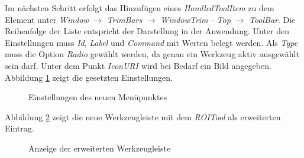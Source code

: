 Im nächsten Schritt erfolgt das Hinzufügen eines \textit{HandledToolItem} zu dem Element unter \textit{Window} $\rightarrow$ \textit{TrimBars} $\rightarrow$ \textit{WindowTrim - Top} $\rightarrow$ \textit{ToolBar}. Die Reihenfolge der Liste entspricht der Darstellung in der Anwendung. Unter den Einstellungen muss \textit{Id}, \textit{Label} und \textit{Command} mit Werten belegt werden. Als \textit{Type} muss die Option \textit{Radio} gewählt werden, da genau ein Werkzeug aktiv ausgewählt sein darf. Unter dem Punkt \textit{IconURI} wird bei Bedarf ein Bild angegeben. Abbildung \ref{tool_handleditem} zeigt die gesetzten Einstellungen.

\begin{figure}[H]
  \vspace{0.5cm}
  \centering
   \caption{Einstellungen des neuen Menüpunktes}
  \label{tool_handleditem}
  \vspace{0.5cm}
\end{figure}

Abbildung \ref{tool_menunew} zeigt die neue Werkzeugleiste mit dem \textit{ROITool} als erweiterten Eintrag.

\begin{figure}[H]
  \vspace{0.5cm}
  \centering
   \caption{Anzeige der erweiterten Werkzeugleiste}
  \label{tool_menunew}
  \vspace{0.5cm}
\end{figure}

